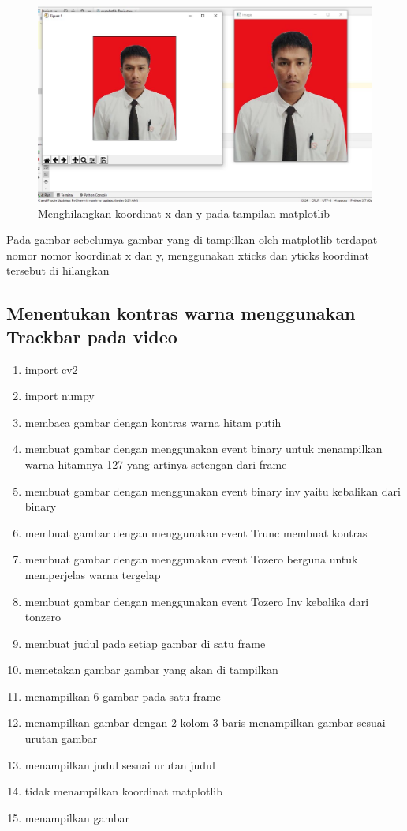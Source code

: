 \newpage
\begin{figure}[ht]
\centering
\includegraphics[scale=0.5]{figures/2,48.jpg}
\caption{Menghilangkan koordinat x dan y pada tampilan matplotlib}
\label{contoh}
\end{figure}
Pada gambar sebelumya gambar yang di tampilkan oleh matplotlib terdapat nomor nomor koordinat x dan y, menggunakan xticks dan yticks koordinat tersebut di hilangkan






\newpage
\subsection{Menentukan kontras warna menggunakan Trackbar pada video}

\begin{enumerate}
	\item import cv2
	\item import numpy
	\item membaca gambar dengan kontras warna hitam putih
	\item membuat gambar dengan menggunakan event binary untuk menampilkan warna hitamnya 127 yang artinya setengan dari frame
	\item membuat gambar dengan menggunakan event binary inv yaitu kebalikan dari binary
	\item membuat gambar dengan menggunakan event Trunc membuat kontras 
	\item membuat gambar dengan menggunakan event Tozero berguna untuk memperjelas warna tergelap
	\item membuat gambar dengan menggunakan event Tozero Inv kebalika dari tonzero
	\item membuat judul pada setiap gambar di satu frame
	\item memetakan gambar gambar yang akan di tampilkan
	\item menampilkan 6 gambar pada satu frame
	\item menampilkan gambar dengan 2 kolom 3 baris menampilkan gambar sesuai urutan gambar
	\item menampilkan judul sesuai urutan judul
	\item tidak menampilkan koordinat matplotlib
	\item menampilkan gambar
\end{enumerate}

